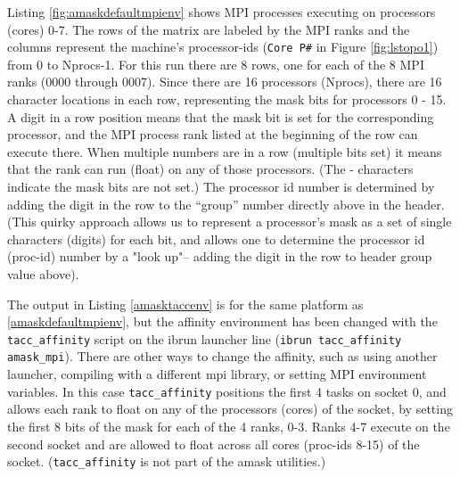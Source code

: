 \documentclass[10pt,a4paper]{report}
\begin{document}
Listing \ref{fig:amaskdefaultmpienv} shows  MPI processes executing on processors (cores) 0-7. 
The rows of the matrix are labeled by the MPI ranks and the columns represent the
machine's processor-ids (\verb+Core P#+ in Figure \ref{fig:lstopo1}) from 0 to Nprocs-1.
For this run there are 8 rows, one for each of the 8 MPI ranks (0000 through 0007).
Since there are 16 processors (Nprocs), there are 16 character locations in each row, 
representing the mask bits for processors 0 - 15.
A digit in a row position means that the mask bit is set for the corresponding
processor, and the MPI process rank listed at the beginning of the row can execute there.
When multiple numbers 
are in a row (multiple bits set) it means that the rank can run (float) on any 
of those processors. (The - characters indicate the mask bits are not set.)
The processor id number is determined by adding the digit in the row to the ``group'' number
directly above in the header. (This quirky approach allows us to represent a 
processor's mask as a set of single characters (digits)
for each bit, and allows one to determine the processor id (proc-id) number by a "look up"-- 
adding the digit in the row to header group value above).



The output in Listing \ref{amasktaccenv} is for the same platform as 
\ref{amaskdefaultmpienv}, but the affinity environment has been changed with 
the \verb+tacc_affinity+ script on the ibrun launcher line (\verb+ibrun tacc_affinity amask_mpi+).
There are other ways to 
change the affinity, such as using another launcher, compiling with 
a different mpi library, or setting MPI environment variables.  In this case 
\verb+tacc_affinity+ positions the first 4 tasks on socket 0, and allows 
each rank to float on any of the processors (cores) of the socket, by setting the first 
8 bits of the mask for each of the 4 ranks, 0-3.  Ranks 4-7
execute on the second socket and are allowed to float across all cores (proc-ids 8-15) 
of the socket.  (\verb+tacc_affinity+ is not part of the amask utilities.)
\end{document}

